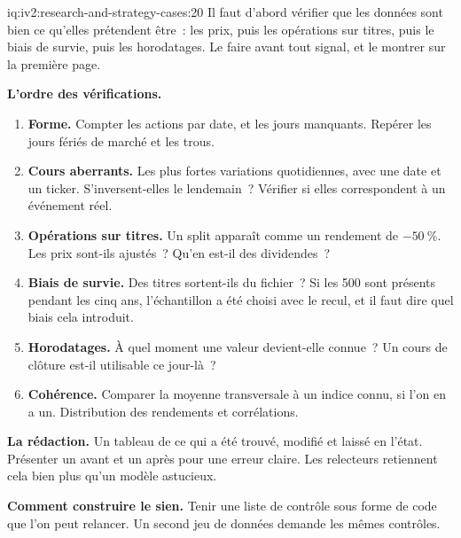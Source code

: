 \begin{solution}{iq:iv2:research-and-strategy-cases:20}
Il faut d'abord vérifier que les données sont bien ce qu'elles prétendent être~: les prix, puis les opérations sur titres, puis le biais de survie, puis les horodatages. Le faire avant tout signal, et le montrer sur la première page.

\textbf{L'ordre des vérifications.}
\begin{enumerate}
\item \textbf{Forme.} Compter les actions par date, et les jours manquants. Repérer les jours fériés de marché et les trous.
\item \textbf{Cours aberrants.} Les plus fortes variations quotidiennes, avec une date et un ticker. S'inversent-elles le lendemain~? Vérifier si elles correspondent à un événement réel.
\item \textbf{Opérations sur titres.} Un split apparaît comme un rendement de $-50~\%$. Les prix sont-ils ajustés~? Qu'en est-il des dividendes~?
\item \textbf{Biais de survie.} Des titres sortent-ils du fichier~? Si les 500 sont présents pendant les cinq ans, l'échantillon a été choisi avec le recul, et il faut dire quel biais cela introduit.
\item \textbf{Horodatages.} À quel moment une valeur devient-elle connue~? Un cours de clôture est-il utilisable ce jour-là~?
\item \textbf{Cohérence.} Comparer la moyenne transversale à un indice connu, si l'on en a un. Distribution des rendements et corrélations.
\end{enumerate}

\textbf{La rédaction.} Un tableau de ce qui a été trouvé, modifié et laissé en l'état. Présenter un avant et un après pour une erreur claire. Les relecteurs retiennent cela bien plus qu'un modèle astucieux.

\textbf{Comment construire le sien.} Tenir une liste de contrôle sous forme de code que l'on peut relancer. Un second jeu de données demande les mêmes contrôles.

\end{solution}

